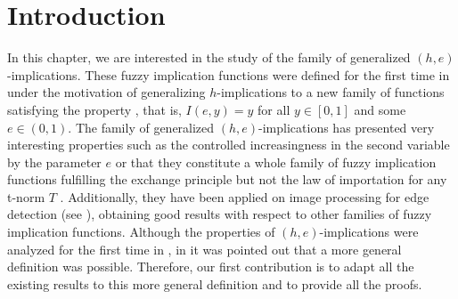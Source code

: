 
\graphicspath{{./_figures/03_heimplications/}}

\section{Introduction}\label{section:introduction(h,e))}

In this chapter, we are interested in the study of the family of generalized $(h,e)$-implications. These fuzzy implication functions were defined for the first time in \cite{Massanet2011A} under the motivation of generalizing $h$-implications to a new family of functions satisfying the property \NPe, that is, $I(e,y)=y$ for all $y \in [0,1]$ and some $e \in (0,1)$.  The family of generalized $(h,e)$-implications has presented very interesting properties such as the controlled increasingness in the second variable by the parameter $e$ or that they constitute a whole family of fuzzy implication functions fulfilling the exchange principle but not the law of importation for any t-norm $T$ \cite{Massanet2011B}. Additionally, they have been applied on image processing for edge detection (see \cite{Gonzalez-Hidalgo2015}), obtaining good results with respect to other families of fuzzy implication functions. Although the properties of $(h,e)$-implications were analyzed for the first time in \cite{Massanet2011A}, in \cite{Hlinena2013} it was pointed out that a more general definition was possible. Therefore, our first contribution is to adapt all the existing results to this more general definition and to provide all the proofs. 


